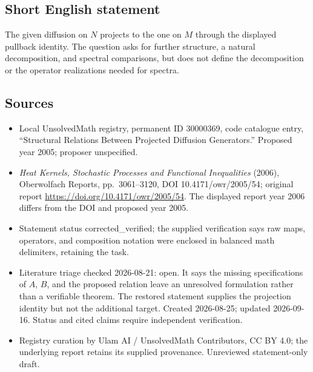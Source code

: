 \documentclass[11pt]{article}
\begin{document}
\subsection{Short English statement}
The given diffusion on $N$ projects to the one on $M$ through the displayed pullback identity. The question asks for further structure, a natural decomposition, and spectral comparisons, but does not define the decomposition or the operator realizations needed for spectra.
\subsection{Sources}
\begin{itemize}
\item Local UnsolvedMath registry, permanent ID 30000369, code catalogue entry, ``Structural Relations Between Projected Diffusion Generators.'' Proposed year 2005; proposer unspecified.
\item \emph{Heat Kernels, Stochastic Processes and Functional Inequalities} (2006), Oberwolfach Reports, pp.\ 3061--3120, DOI 10.4171/owr/2005/54; original report \url{https://doi.org/10.4171/owr/2005/54}. The displayed report year 2006 differs from the DOI and proposed year 2005.
\item Statement status corrected\_verified; the supplied verification says raw maps, operators, and composition notation were enclosed in balanced math delimiters, retaining the task.
\item Literature triage checked 2026-08-21: open. It says the missing specifications of $A$, $B$, and the proposed relation leave an unresolved formulation rather than a verifiable theorem. The restored statement supplies the projection identity but not the additional target. Created 2026-08-25; updated 2026-09-16. Status and cited claims require independent verification.
\item Registry curation by Ulam AI / UnsolvedMath Contributors, CC BY 4.0; the underlying report retains its supplied provenance. Unreviewed statement-only draft.
\end{itemize}
\end{document}
